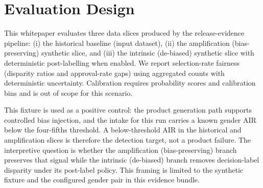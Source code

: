 
\section{Evaluation Design}
This whitepaper evaluates three data slices produced by the \ProductReleaseTag{} release-evidence pipeline: (i) the historical baseline (input dataset), (ii) the amplification (bias-preserving) synthetic slice, and (iii) the intrinsic (de-biased) synthetic slice with deterministic post-labelling when enabled. We report selection-rate fairness (disparity ratios and approval-rate gaps) using aggregated counts with deterministic uncertainty. Calibration requires probability scores and calibration bins and is out of scope for this scenario.

This fixture is used as a positive control: the product generation path supports controlled bias injection, and the intake for this run carries a known gender AIR below the four-fifths threshold. A below-threshold AIR in the historical and amplification slices is therefore the detection target, not a product failure. The interpretive question is whether the amplification (bias-preserving) branch preserves that signal while the intrinsic (de-biased) branch removes decision-label disparity under its post-label policy. This framing is limited to the synthetic fixture and the configured gender pair in this evidence bundle.
